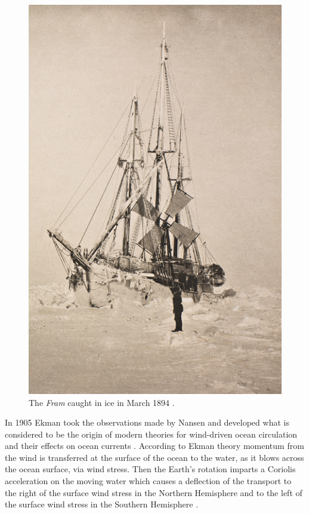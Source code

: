 \begin{figure}
  \includegraphics[scale=0.35]{Figures/Fram.jpg}
  \caption{The \emph{Fram} caught in ice in March 1894 \cite{Nansen1897}.}
  \label{fig:Fram}
\end{figure}
In 1905 Ekman \cite{Ekman1905} took the observations made by Nansen and developed
what is considered to be the origin of modern theories for wind-driven ocean
circulation and their effects on ocean currents \cite{Price1987}. According to
Ekman theory momentum from the wind is transferred at the surface of the ocean
to the water, as it blows across the ocean surface, via wind stress. Then the
Earth's rotation imparts a Coriolis acceleration on the moving water which
causes a deflection of the transport to the right of the surface wind stress in
the Northern Hemisphere and to the left of the surface wind stress in the
Southern Hemisphere \cite{Beesley2008}.

